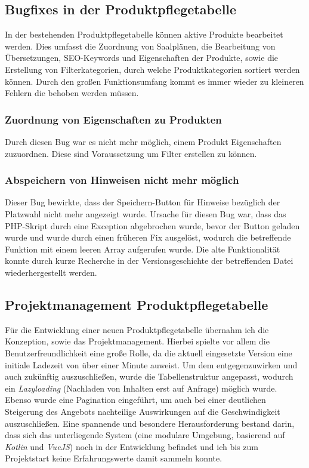 \subsection{Bugfixes in der Produktpflegetabelle}
In der bestehenden Produktpflegetabelle können aktive Produkte bearbeitet werden. Dies umfasst die Zuordnung von Saalplänen, die Bearbeitung von Übersetzungen, SEO-Keywords und Eigenschaften der Produkte, sowie die Erstellung von Filterkategorien, durch welche Produktkategorien sortiert werden können. Durch den großen Funktionsumfang kommt es immer wieder zu kleineren Fehlern die behoben werden müssen.
\subsubsection{Zuordnung von Eigenschaften zu Produkten}
Durch diesen Bug war es nicht mehr möglich, einem Produkt Eigenschaften zuzuordnen. Diese sind Voraussetzung um Filter erstellen zu können.
\subsubsection{Abspeichern von Hinweisen nicht mehr möglich}
Dieser Bug bewirkte, dass der Speichern-Button für Hinweise bezüglich der Platzwahl nicht mehr angezeigt wurde. Ursache für diesen Bug war, dass das PHP-Skript durch eine Exception abgebrochen wurde, bevor der Button geladen wurde und wurde durch einen früheren Fix ausgelöst, wodurch die betreffende Funktion mit einem leeren Array aufgerufen wurde. Die alte Funktionalität konnte durch kurze Recherche in der Versionsgeschichte der betreffenden Datei wiederhergestellt werden.
\subsection{Projektmanagement Produktpflegetabelle}
Für die Entwicklung einer neuen Produktpflegetabelle übernahm ich die Konzeption, sowie das Projektmanagement. Hierbei spielte vor allem die Benutzerfreundlichkeit 
eine große Rolle, da die aktuell eingesetzte Version eine initiale Ladezeit von über einer Minute auweist. Um dem entgegenzuwirken und auch zukünftig auszuschließen,
wurde die Tabellenstruktur angepasst, wodurch ein \textit{Lazyloading} (Nachladen von Inhalten erst auf Anfrage) möglich wurde. Ebenso wurde eine Pagination 
eingeführt, um auch bei einer deutlichen Steigerung des Angebots nachteilige Auswirkungen auf die Geschwindigkeit auszuschließen. Eine spannende und besondere 
Herausforderung bestand darin, dass sich das unterliegende System (eine modulare Umgebung, basierend auf \textit{Kotlin} und \textit{VueJS}) noch in der Entwicklung
befindet und ich bis zum Projektstart keine Erfahrungswerte damit sammeln konnte.
